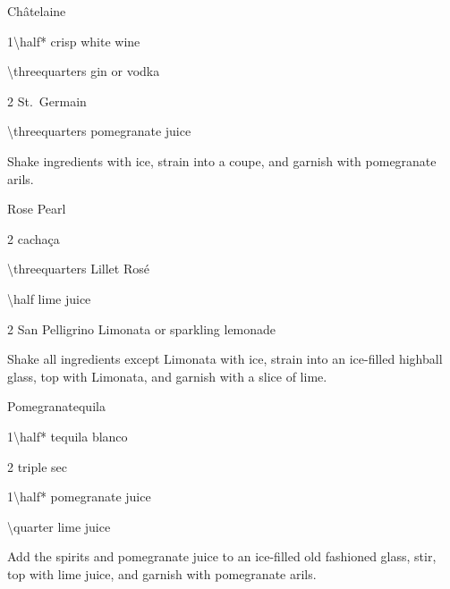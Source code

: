 \begin{Cocktail}{Ch\^atelaine}
	\begin{Ingredients}
	\item \SI{1\half*}{\oz} crisp white wine
	\item \SI{\threequarters}{\oz} gin or vodka
	\item \SI{2}{\tsp} St.\ Germain
	\item \SI{\threequarters}{\oz} pomegranate juice
	\end{Ingredients}
	
	\begin{Instructions}
	Shake ingredients with ice, strain into a coupe, and garnish with pomegranate arils.
	\end{Instructions}
\end{Cocktail}

\begin{Cocktail}{Rose Pearl}
	\begin{Ingredients}
	\item \SI{2}{\oz} cacha\c{c}a
	\item \SI{\threequarters}{\oz} Lillet Ros\'e
	\item \SI{\half}{\oz} lime juice
	\item \SI{2}{\oz} San Pelligrino Limonata or sparkling lemonade
	\end{Ingredients}
	
	\begin{Instructions}
	Shake all ingredients except Limonata with ice, strain into an ice-filled highball glass, top with Limonata, and garnish with a slice of lime.
	\end{Instructions}
\end{Cocktail}

\begin{Cocktail}{Pomegranatequila}
	\begin{Ingredients}
	\item \SI{1\half*}{\oz} tequila blanco
	\item \SI{2}{\tsp} triple sec
	\item \SI{1\half*}{\oz} pomegranate juice
	\item \SI{\quarter}{\oz} lime juice
	\end{Ingredients}
	
	\begin{Instructions}
	Add the spirits and pomegranate juice to an ice-filled old fashioned glass, stir, top with lime juice, and garnish with pomegranate arils.
	\end{Instructions}
\end{Cocktail}


